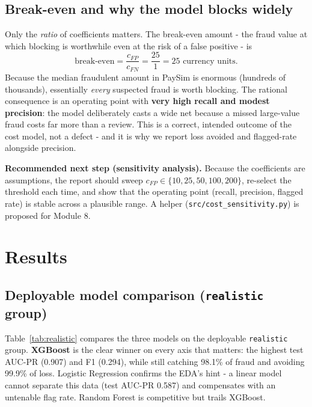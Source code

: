 \documentclass[11pt,a4paper]{report}
\newcommand{\code}[1]{\texttt{\small #1}}
\begin{document}
\subsection{Break-even and why the model blocks widely}

Only the \emph{ratio} of coefficients matters. The break-even amount - the fraud value at
which blocking is worthwhile even at the risk of a false positive - is
\[
\text{break-even} = \frac{c_{FP}}{c_{FN}} = \frac{25}{1} = 25 \text{ currency units}.
\]
Because the median fraudulent amount in PaySim is enormous (hundreds of thousands),
essentially \emph{every} suspected fraud is worth blocking. The rational consequence is an
operating point with \textbf{very high recall and modest precision}: the model deliberately
casts a wide net because a missed large-value fraud costs far more than a review. This is a
correct, intended outcome of the cost model, not a defect - and it is why we report loss
avoided and flagged-rate alongside precision.

\begin{keybox}
\textbf{Recommended next step (sensitivity analysis).} Because the coefficients are
assumptions, the report should sweep $c_{FP}\in\{10,25,50,100,200\}$, re-select the
threshold each time, and show that the operating point (recall, precision, flagged rate) is
stable across a plausible range. A helper (\code{src/cost\_sensitivity.py}) is proposed for
Module 8.
\end{keybox}

\section{Results}

\subsection{Deployable model comparison (\code{realistic} group)}

Table~\ref{tab:realistic} compares the three models on the deployable \code{realistic}
group. \textbf{XGBoost} is the clear winner on every axis that matters: the highest test
AUC-PR (0.907) and F1 (0.294), while still catching 98.1\% of fraud and avoiding 99.9\% of
loss. Logistic Regression confirms the EDA's hint - a linear model cannot separate this data
(test AUC-PR 0.587) and compensates with an untenable flag rate. Random Forest is
competitive but trails XGBoost.
\end{document}
